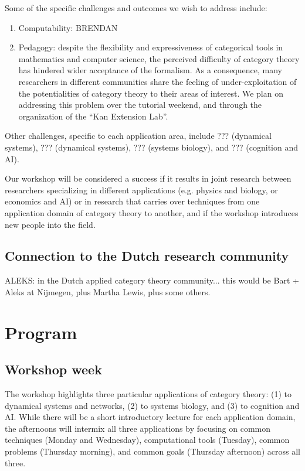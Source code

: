 \documentclass{article}
\newcommand{\redout}[1]{{\color{red}#1}}
\begin{document}
Some of the specific challenges and outcomes we wish to address include:
\begin{enumerate}
\item Computability: \redout{BRENDAN}
\item Pedagogy: despite the flexibility and expressiveness of categorical tools in mathematics and computer science, the perceived difficulty of category theory has hindered wider acceptance of the formalism. As a consequence, many researchers in different communities share the feeling of under-exploitation of the potentialities of category theory to their areas of interest. We plan on addressing this problem over the tutorial weekend, and through the organization of the ``Kan Extension Lab''.
\end{enumerate}

Other challenges, specific to each application area, include \redout{???} (dynamical systems), \redout{???} (dynamical systems), \redout{???} (systems biology), and \redout{???} (cognition and AI).

Our workshop will be considered a success if it results in joint research between researchers specializing in different applications (e.g. physics and biology, or economics and AI) or in research that carries over techniques from one application domain of category theory to another, and if the workshop introduces new people into the field.

\subsection{Connection to the Dutch research community}
\redout{ALEKS: in the Dutch applied category theory community... this would be Bart + Aleks at Nijmegen, plus Martha Lewis, plus some others.}

\section{Program}
\subsection{Workshop week}
The workshop highlights three particular applications of category theory: (1) to dynamical systems and networks, (2) to systems biology, and (3) to cognition and AI. While there will be a short introductory lecture for each application domain, the afternoons will intermix all three applications by focusing on common techniques (Monday and Wednesday), computational tools (Tuesday), common problems (Thursday morning), and common goals (Thursday afternoon) across all three.
\end{document}
